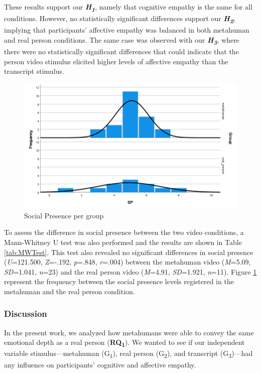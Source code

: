 These results support our \textbf{\textit{H\textsubscript{1}}}, namely that cognitive empathy is the same for all conditions. However, no statistically significant differences support our \textbf{\textit{H\textsubscript{2}}}, implying that participants' affective empathy was balanced in both metahuman and real person conditions. The same case was observed with our \textbf{\textit{H\textsubscript{3}}}, where there were no statistically significant differences that could indicate that the person video stimulus elicited higher levels of affective empathy than the transcript stimulus.

\begin{figure}[!htb]
\includegraphics[width=\textwidth]{figures/MWSample.png}
\centering
\caption{Social Presence per group}
\label{fig:MWSample}
\end{figure}

To assess the difference in social presence between the two video conditions, a Mann-Whitney U test was also performed and the results are shown in Table \ref{tab:MWTest}. This test also revealed no significant differences in social presence (\textit{U}=121.500, \textit{Z}=-.192, \textit{p}=.848, \textit{r}=.004) between the metahuman video (\textit{M}=5.09, \textit{SD}=1.041, \textit{n}=23) and the real person video (\textit{M}=4.91, \textit{SD}=1.921, \textit{n}=11). Figure \ref{fig:MWSample} represent the frequency between the social presence levels registered in the metahuman and the real person condition.

\subsubsection{Discussion}
In the present work, we analyzed how metahumans were able to convey the same emotional depth as a real person (\textbf{RQ\textsubscript{1}}). We wanted to see if our independent variable stimulus---metahuman (G\textsubscript{1}), real person (G\textsubscript{2}), and transcript (G\textsubscript{3})---had any influence on participants' cognitive and affective empathy.

